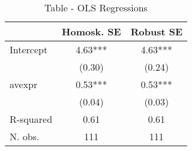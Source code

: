\begin{table}
\caption{Table - OLS Regressions}
\begin{center}
\begin{tabular}{lcc}
\hline
          & Homosk. SE & Robust SE  \\
\midrule
Intercept & 4.63***    & 4.63***    \\
          & (0.30)     & (0.24)     \\
avexpr    & 0.53***    & 0.53***    \\
          & (0.04)     & (0.03)     \\
R-squared & 0.61       & 0.61       \\
N. obs.   & 111        & 111        \\
\hline
\end{tabular}
\end{center}
\end{table}